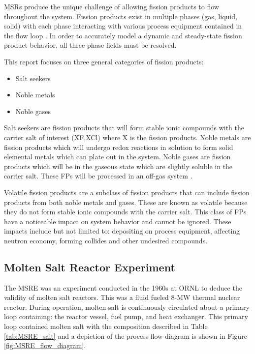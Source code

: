 MSRs produce the unique challenge of allowing fission products to flow throughout the system. Fission products exist in multiple phases (gas, liquid, solid) with each phase interacting with various process equipment contained in the flow loop \cite{grimes1975}. In order to accurately model a dynamic and steady-state fission product behavior, all three phase fields must be resolved.  

This report focuses on three general categories of fission products:

\begin{itemize}
	\item Salt seekers
	\item Noble metals
	\item Noble gases
\end{itemize}

Salt seekers are fission products that will form stable ionic compounds with the carrier salt of interest (XF,XCl) where X is the fission products. Noble metals are fission products which will undergo redox reactions in solution to form solid elemental metals which can plate out in the system. Noble gases are fission products which will be in the gaseous state which are slightly soluble in the carrier salt. These FPs will be processed in an off-gas system \cite{grimes1975}.  

Volatile fission products are a subclass of fission products that can include fission products from both noble metals and gases. These are known as volatile because they do not form stable ionic compounds with the carrier salt. This class of FPs have a noticeable impact on system behavior and cannot be ignored. These impacts include but not limited to: depositing on process equipment, affecting neutron economy, forming collides and other undesired compounds. 


\subsection{Molten Salt Reactor Experiment}
The MSRE was an experiment conducted in the 1960s at ORNL to deduce the validity of molten salt reactors. This was a fluid fueled 8-MW thermal nuclear reactor. During operation, molten salt is continuously circulated about a primary loop containing: the reactor vessel, fuel pump, and heat exchanger. This primary loop contained molten salt with the composition described in Table \ref{tab:MSRE_salt} \cite{engel1970} and a depiction of the process flow diagram is shown in Figure \ref{fig:MSRE_flow_diagram}. 



